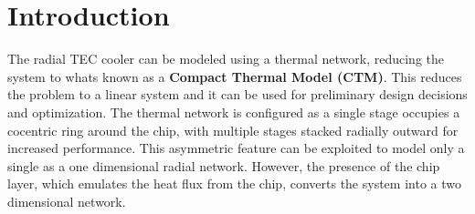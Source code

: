 \documentclass[10pt,a4paper,twocolumn]{article}
\begin{document}

\section{Introduction}

The radial TEC cooler can be modeled using a thermal network, reducing the system to whats known as a \textbf{Compact Thermal Model (CTM)}. This reduces the problem to a linear system and it can be used for preliminary design decisions and optimization. The thermal network is configured as a single stage occupies a cocentric ring around the chip, with multiple stages stacked radially outward for increased performance. This asymmetric feature can be exploited to model only a single as a one dimensional radial network. However, the presence of the chip layer, which emulates the heat flux from the chip, converts the system into a two dimensional network.
\end{document}
